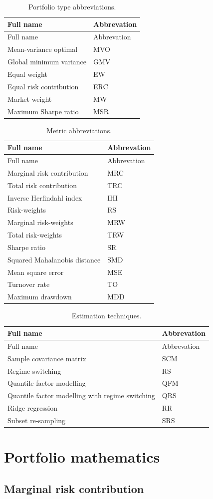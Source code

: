 \documentclass[
]{article}
\begin{document}
\begin{longtable}[]{@{}ll@{}}
\caption{\label{tab:portabb} Portfolio type abbreviations.}\tabularnewline
\toprule
Full name & Abbrevation\tabularnewline
\midrule
\endfirsthead
\toprule
Full name & Abbrevation\tabularnewline
\midrule
\endhead
Mean-variance optimal & MVO\tabularnewline
Global minimum variance & GMV\tabularnewline
Equal weight & EW\tabularnewline
Equal risk contribution & ERC\tabularnewline
Market weight & MW\tabularnewline
Maximum Sharpe ratio & MSR\tabularnewline
\bottomrule
\end{longtable}

\begin{longtable}[]{@{}ll@{}}
\caption{\label{tab:metricabb} Metric abbreviations.}\tabularnewline
\toprule
Full name & Abbrevation\tabularnewline
\midrule
\endfirsthead
\toprule
Full name & Abbrevation\tabularnewline
\midrule
\endhead
Marginal risk contribution & MRC\tabularnewline
Total risk contribution & TRC\tabularnewline
Inverse Herfindahl index & IHI\tabularnewline
Risk-weights & RS\tabularnewline
Marginal risk-weights & MRW\tabularnewline
Total risk-weights & TRW\tabularnewline
Sharpe ratio & SR\tabularnewline
Squared Mahalanobis distance & SMD\tabularnewline
Mean square error & MSE\tabularnewline
Turnover rate & TO\tabularnewline
Maximum drawdown & MDD\tabularnewline
\bottomrule
\end{longtable}

\begin{longtable}[]{@{}ll@{}}
\caption{\label{tab:esttech} Estimation techniques.}\tabularnewline
\toprule
Full name & Abbrevation\tabularnewline
\midrule
\endfirsthead
\toprule
Full name & Abbrevation\tabularnewline
\midrule
\endhead
Sample covariance matrix & SCM\tabularnewline
Regime switching & RS\tabularnewline
Quantile factor modelling & QFM\tabularnewline
Quantile factor modelling with regime switching & QRS\tabularnewline
Ridge regression & RR\tabularnewline
Subset re-sampling & SRS\tabularnewline
\bottomrule
\end{longtable}

\hypertarget{portfolio-mathematics}{%
\section{Portfolio mathematics}\label{portfolio-mathematics}}

\hypertarget{mrcapp}{%
\subsection{Marginal risk contribution}\label{mrcapp}}
\end{document}
